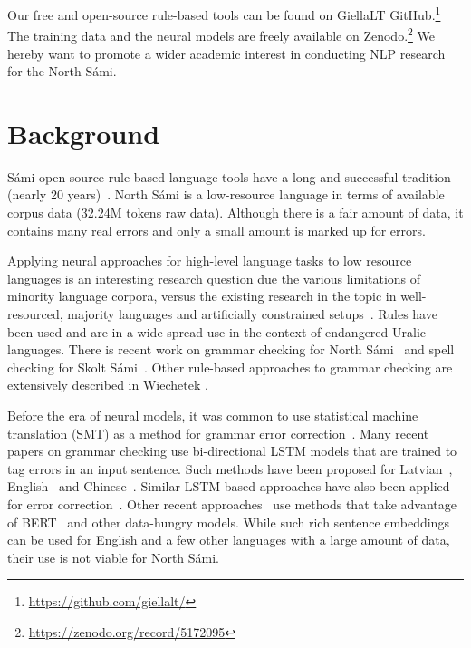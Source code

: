 \documentclass[postprint]{flammie}
\begin{document}
Our free and open-source rule-based tools can be found on GiellaLT
GitHub.\footnote{\url{https://github.com/giellalt/}} The training data and the
neural models are freely available on
Zenodo.\footnote{\url{https://zenodo.org/record/5172095}} We hereby want to
promote a wider academic interest in conducting NLP research for the North Sámi.

\section{Background}

Sámi open source rule-based language tools have a long and successful tradition
(nearly 20 years)~\cite{trosterud2004porting,
moshagen2011tilgjengelegheit,antonsen2011next,rueter2020fst}.
North Sámi is a low-resource language in terms of available corpus data (32.24M
tokens raw data). Although there is a fair amount of data, it contains many real
errors and only  a small amount is marked up for errors.


Applying neural approaches for high-level language tasks to low resource
languages is an interesting research question due the various limitations of
minority language corpora, versus the existing research in the topic in
well-resourced, majority languages and artificially constrained
setups~\cite{nekoto2020participatory}.  Rules have been used and are in a
wide-spread use in the context of endangered Uralic languages. There is recent
work on grammar checking for North Sámi~\cite{wiechetek2019seeing} and spell
checking for Skolt Sámi~\cite{trosterud2021soft}.  Other rule-based approaches
to grammar checking are extensively described in Wiechetek
\cite{wiechetek2017when}.

Before the era of neural models, it was common to use statistical machine
translation (SMT) as a method for grammar error
correction~\cite{behera2013automated,kunchukuttan2014tuning,
hoang2016exploiting}.  Many recent papers on grammar checking use bi-directional
LSTM models that are trained to tag errors in an input sentence. Such methods
have been proposed for Latvian~\cite{deksne2019bidirectional},
English~\cite{rei-yannakoudakis-2016-compositional} and
Chinese~\cite{huang2016bi}.  Similar LSTM based approaches have also been
applied for error
correction~\cite{yuan2016grammatical,ge2019automatic,jahan2021bangla}.  Other
recent approaches~\cite{kantor2019learning,omelianchuk2020gector} use methods
that take advantage of BERT~\cite{devlin-etal-2019-bert} and other data-hungry
models.  While such rich sentence embeddings can be used for English and a few
other languages with a large amount of data, their use is not viable for North
Sámi.
\end{document}
